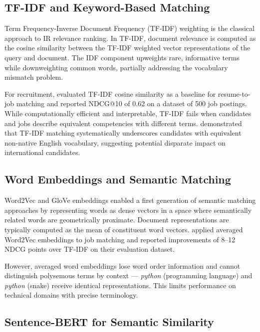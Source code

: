 \subsection{TF-IDF and Keyword-Based Matching}

Term Frequency-Inverse Document Frequency (TF-IDF) weighting \citep{Salton1983} is the classical approach to IR relevance ranking. In TF-IDF, document relevance is computed as the cosine similarity between the TF-IDF weighted vector representations of the query and document. The IDF component upweights rare, informative terms while downweighting common words, partially addressing the vocabulary mismatch problem.

For recruitment, \citet{Bizer2012} evaluated TF-IDF cosine similarity as a baseline for resume-to-job matching and reported NDCG@10 of 0.62 on a dataset of 500 job postings. While computationally efficient and interpretable, TF-IDF fails when candidates and jobs describe equivalent competencies with different terms. \citet{Shen2018} demonstrated that TF-IDF matching systematically underscores candidates with equivalent non-native English vocabulary, suggesting potential disparate impact on international candidates.

\subsection{Word Embeddings and Semantic Matching}

Word2Vec \citep{Mikolov2013} and GloVe \citep{Pennington2014} embeddings enabled a first generation of semantic matching approaches by representing words as dense vectors in a space where semantically related words are geometrically proximate. Document representations are typically computed as the mean of constituent word vectors. \citet{Kang2019} applied averaged Word2Vec embeddings to job matching and reported improvements of 8--12 NDCG points over TF-IDF on their evaluation dataset.

However, averaged word embeddings lose word order information and cannot distinguish polysemous terms by context --- \textit{python} (programming language) and \textit{python} (snake) receive identical representations. This limits performance on technical domains with precise terminology.

\subsection{Sentence-BERT for Semantic Similarity}

